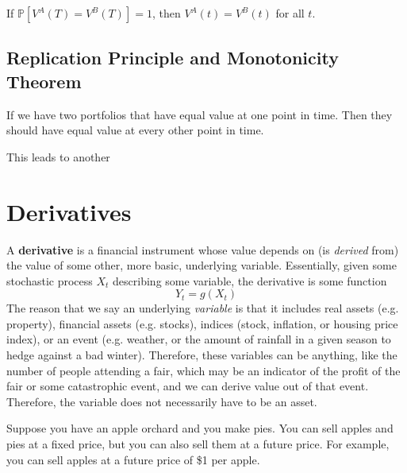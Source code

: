 \documentclass{article}
\begin{document}
    \begin{corollary}[Equality]
      \label{thm:equality}
      If $\mathbb{P}[V^A (T) = V^B (T)] = 1$, then $V^A (t) = V^B (t)$ for all $t$. 
    \end{corollary}

  \subsection{Replication Principle and Monotonicity Theorem}

    \begin{theorem}
      \label{thm:replication-principle}
      If we have two portfolios that have equal value at one point in time. Then they should have equal value at every other point in time. 
    \end{theorem}

    This leads to another 

\section{Derivatives}

  \begin{definition}[Derivatives]
    \label{def:derivatives}
    A \textbf{derivative} is a financial instrument whose value depends on (is \textit{derived} from) the value of some other, more basic, underlying variable. Essentially, given some stochastic process $X_t$ describing some variable, the derivative is some function 
    \begin{equation}
      Y_t = g(X_t)
    \end{equation}
    The reason that we say an underlying \textit{variable} is that it includes real assets (e.g. property), financial assets (e.g. stocks), indices (stock, inflation, or housing price index), or an event (e.g. weather, or the amount of rainfall in a given season to hedge against a bad winter). Therefore, these variables can be anything, like the number of people attending a fair, which may be an indicator of the profit of the fair or some catastrophic event, and we can derive value out of that event. Therefore, the variable does not necessarily have to be an asset. 
  \end{definition}

  \begin{example}
    \label{ex:apples-and-pies}
 
    Suppose you have an apple orchard and you make pies. You can sell apples and pies at a fixed price, but you can also sell them at a future price. For example, you can sell apples at a future price of \$1 per apple. 
  \end{example}
\end{document}
